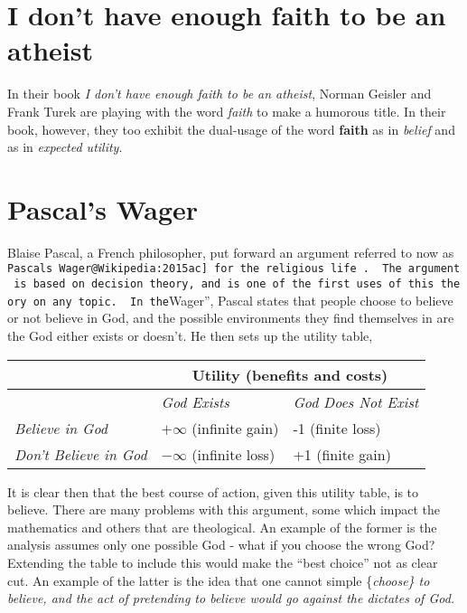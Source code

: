 \documentclass{tufte-book}
\begin{document}
\section{I don't have enough faith to be an
atheist}\label{i-dont-have-enough-faith-to-be-an-atheist}

In their book \emph{I don't have enough faith to be an
atheist}\citep{geisler2004don}, Norman Geisler and Frank Turek are
playing with the word \emph{faith} to make a humorous title. In their
book, however, they too exhibit the dual-usage of the word
\textbf{faith} as in \emph{belief} and as in \emph{expected utility}.

\section{Pascal's Wager}\label{pascals-wager}

Blaise Pascal, a French philosopher, put forward an argument referred to
now as
\texttt{Pascal\textquotesingle{}s\ Wager\textquotesingle{}\textquotesingle{}{[}@Wikipedia:2015ac{]}\ for\ the\ religious\ life\ .\ \ The\ argument\ is\ based\ on\ decision\ theory,\ and\ is\ one\ of\ the\ first\ uses\ of\ this\ theory\ on\ any\ topic.\ \ In\ the}Wager'',
Pascal states that people choose to believe or not believe in God, and
the possible environments they find themselves in are the God either
exists or doesn't. He then sets up the utility table,

\begin{tabular}{@{}lll@{}}
\toprule
 & \multicolumn{2}{c}{\textbf{Utility (benefits and costs)}}  \\ \midrule
 & \textit{God Exists} & \textit{God Does Not Exist}\\
\textit{Believe in God} & $+\infty$ (infinite gain) & -1 (finite loss)   \\
\textit{Don't Believe in God} & $-\infty$ (infinite loss) & +1 (finite gain) \\ \bottomrule
\end{tabular}\vspace{.1in}

It is clear then that the best course of action, given this utility
table, is to believe. There are many problems with this argument, some
which impact the mathematics and others that are theological. An example
of the former is the analysis assumes only one possible God - what if
you choose the wrong God? Extending the table to include this would make
the ``best choice'' not as clear cut. An example of the latter is the
idea that one cannot simple \{\em choose\} to believe, and the act of
pretending to believe would go against the dictates of God.
\end{document}
